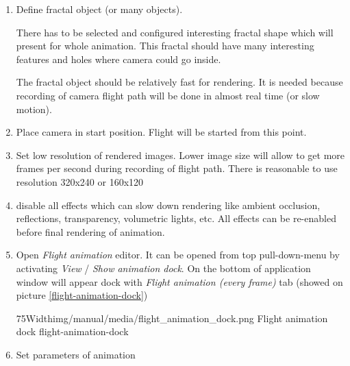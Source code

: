 \begin{enumerate}
	\item Define fractal object (or many objects). 
	
	There has to be selected and configured interesting fractal shape which will present for whole animation. This fractal should have many interesting features and holes where camera could go inside.
	
	The fractal object should be relatively fast for rendering. It is needed because recording of camera flight path will be done in almost real time (or slow motion). 
	
	\item Place camera in start position. Flight will be started from this point.
	
	\item Set low resolution of rendered images. Lower image size will allow to get more frames per second during recording of flight path. There is reasonable to use resolution 320x240 or 160x120
	
	\item disable all effects which can slow down rendering like ambient occlusion, reflections, transparency, volumetric lights, etc. All effects can be re-enabled before final rendering of animation.
	
	\item Open \emph{Flight animation} editor. It can be opened from top pull-down-menu by activating \emph{View} / \emph{Show animation dock}. On the bottom of application window will appear dock with \emph{Flight animation (every frame)} tab (showed on picture \ref{flight-animation-dock})
	
	\simpleImageWithCaption75Width{img/manual/media/flight_animation_dock.png}
	{Flight animation dock}
	{flight-animation-dock}
	
	\item Set parameters of animation
	

\end{enumerate}
